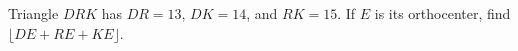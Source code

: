 Triangle $DRK$ has $DR=13$, $DK=14$, and $RK=15$. If $E$ is its orthocenter, find $\lfloor DE+RE+KE\rfloor$.
